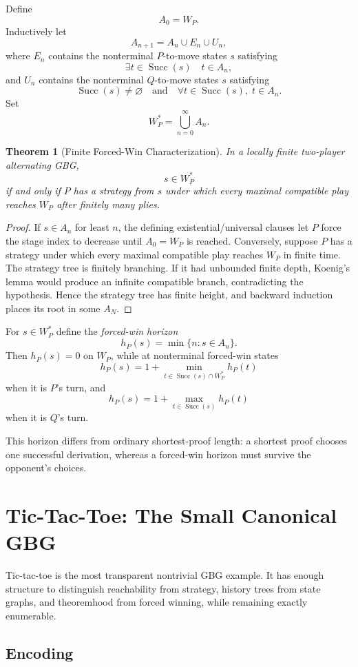 \documentclass[11pt]{article}
\newtheorem{theorem}{Theorem}[section]
\theoremstyle{definition}
\theoremstyle{remark}
\newcommand{\Succ}{\operatorname{Succ}}
\begin{document}
Define
\[
A_0=W_P.
\]
Inductively let
\[
A_{n+1}=A_n\cup E_n\cup U_n,
\]
where $E_n$ contains the nonterminal $P$-to-move states $s$ satisfying
\[
\exists t\in\Succ(s)\quad t\in A_n,
\]
and $U_n$ contains the nonterminal $Q$-to-move states $s$ satisfying
\[
\Succ(s)\neq\varnothing
\quad\text{and}\quad
\forall t\in\Succ(s),\;t\in A_n.
\]
Set
\[
W_P^*=\bigcup_{n=0}^\infty A_n.
\]

\begin{theorem}[Finite Forced-Win Characterization]
In a locally finite two-player alternating GBG,
\[
\boxed{s\in W_P^*}
\]
if and only if $P$ has a strategy from $s$ under which every maximal compatible play reaches $W_P$ after finitely many plies.
\end{theorem}

\begin{proof}
If $s\in A_n$ for least $n$, the defining existential/universal clauses let $P$ force the stage index to decrease until $A_0=W_P$ is reached. Conversely, suppose $P$ has a strategy under which every maximal compatible play reaches $W_P$ in finite time. The strategy tree is finitely branching. If it had unbounded finite depth, Koenig's lemma would produce an infinite compatible branch, contradicting the hypothesis. Hence the strategy tree has finite height, and backward induction places its root in some $A_N$.
\end{proof}

For $s\in W_P^*$ define the \emph{forced-win horizon}
\[
h_P(s)=\min\{n:s\in A_n\}.
\]
Then $h_P(s)=0$ on $W_P$, while at nonterminal forced-win states
\[
h_P(s)=1+\min_{t\in\Succ(s)\cap W_P^*}h_P(t)
\]
when it is $P$'s turn, and
\[
h_P(s)=1+\max_{t\in\Succ(s)}h_P(t)
\]
when it is $Q$'s turn.

This horizon differs from ordinary shortest-proof length: a shortest proof chooses one successful derivation, whereas a forced-win horizon must survive the opponent's choices.

\section{Tic-Tac-Toe: The Small Canonical GBG}

Tic-tac-toe is the most transparent nontrivial GBG example. It has enough structure to distinguish reachability from strategy, history trees from state graphs, and theoremhood from forced winning, while remaining exactly enumerable.

\subsection{Encoding}
\end{document}
